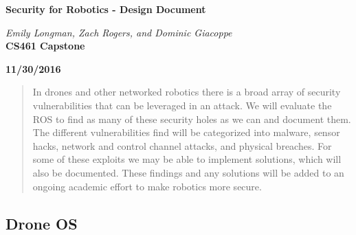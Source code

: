 \documentclass[IEEEtran,letterpaper,10pt,titlepage,draftclsnofoot,onecolumn]{article}
\begin{document}
\begin{titlepage}
  \begin{center}
    \vspace*{1cm}

    \huge
    \textbf{Security for Robotics - Design Document}
  \vspace{0.5cm}

    \textit{Emily Longman, Zach Rogers, and Dominic Giacoppe}\\
  \vspace{0.5cm}
    \vfill
    \large
    \textbf{CS461 Capstone}\\
  \vspace{5mm}

    \textbf{11/30/2016}\\

    \vfill
    \end{center}
\end{titlepage}

\begin{abstract}
  In drones and other networked robotics there is a broad array of security vulnerabilities that can be leveraged in an attack.
  We will evaluate the ROS to find as many of these security holes as we can and document them.
  The different vulnerabilities find will be categorized into malware, sensor hacks, network and control channel attacks, and physical breaches.
  For some of these exploits we may be able to implement solutions, which will also be documented.
  These findings and any solutions will be added to an ongoing academic effort to make robotics more secure.
\end{abstract}

\subsection*{Drone OS}
\end{document}
